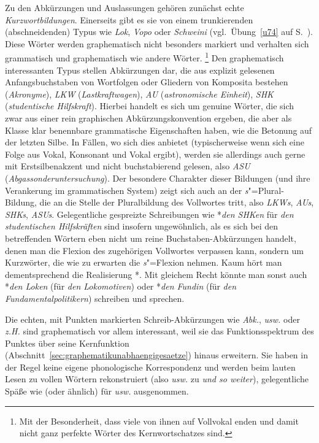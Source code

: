 Zu den Abkürzungen und Auslassungen gehören zunächst echte \textit{Kurzwortbildungen}.
Einerseits gibt es sie von einem trunkierenden (abschneidenden) Typus wie \textit{Lok}, \textit{Vopo} oder \textit{Schweini} (vgl.\ Übung~\ref{u74} auf S.~\pageref{u74}).
Diese Wörter werden graphematisch nicht besonders markiert und verhalten sich grammatisch und graphematisch wie andere Wörter.%
\footnote{Mit der Besonderheit, dass viele von ihnen auf Vollvokal enden und damit nicht ganz perfekte Wörter des Kernwortschatzes sind.}
Den graphematisch interessanten Typus stellen Abkürzungen dar, die aus explizit gelesenen Anfangsbuchstaben von Wortfolgen oder Gliedern von Komposita bestehen (\textit{Akronyme}), \zB \textit{LKW} \textipa{[PElkave:]} (\textit{Lastkraftwagen}), \textit{AU} \textipa{[Pa:Pu:]} (\textit{astronomische Einheit}), \textit{SHK} \textipa{[PEshaka:]} (\textit{studentische Hilfskraft}).
Hierbei handelt es sich um genuine Wörter, die sich zwar aus einer rein graphischen Abkürzungskonvention ergeben, die aber als Klasse klar benennbare grammatische Eigenschaften haben, wie \zB die Betonung auf der letzten Silbe.
In Fällen, wo sich dies anbietet (typischerweise wenn sich eine Folge aus Vokal, Konsonant und Vokal ergibt), werden sie allerdings auch gerne mit Erstsilbenakzent und nicht buchstabierend gelesen, also \textit{ASU} \textipa{[Pa:zu]} (\textit{Abgassonderuntersuchung}).
Der besondere Charakter dieser Bildungen (und ihre Verankerung im grammatischen System) zeigt sich auch an der \textit{s}"=Plural-Bildung, die an die Stelle der Pluralbildung des Vollwortes tritt, also \textit{LKWs}, \textit{AUs}, \textit{SHKs}, \textit{ASUs}.
Gelegentliche gespreizte Schreibungen wie *\textit{den SHKen} für \textit{den studentischen Hilfskräften} sind insofern ungewöhnlich, als es sich bei den betreffenden Wörtern eben nicht um reine Buchstaben-Abkürzungen handelt, denen man die Flexion des zugehörigen Vollwortes verpassen kann, sondern um Kurzwörter, die wie zu erwarten die \textit{s}"=Flexion nehmen.
Kaum hört man dementsprechend die Realisierung *\textipa{[PEshaka:@n]}.
Mit gleichem Recht könnte man sonst auch *\textit{den Loken} (für \textit{den Lokomotiven}) oder *\textit{den Fundin} (für \textit{den Fundamentalpolitikern}) schreiben und sprechen.

Die echten, mit Punkten markierten Schreib-Abkürzungen wie \textit{Abk.}, \textit{usw.} oder \textit{z.H.} sind graphematisch vor allem interessant, weil sie das Funktionsspektrum des Punktes über seine Kernfunktion (Abschnitt~\ref{sec:graphematikunabhaengigesaetze}) hinaus erweitern.
Sie haben in der Regel keine eigene phonologische Korrespondenz und werden beim lauten Lesen zu vollen Wörtern rekonstruiert (also \zB \textit{usw.} zu \textit{und so weiter}), gelegentliche Späße wie \zB \textipa{[PUz@v@]} (oder ähnlich) für \textit{usw.} ausgenommen.

